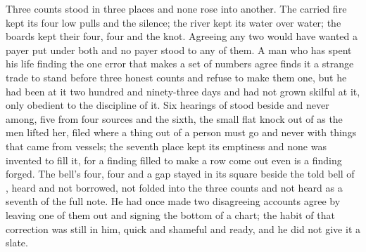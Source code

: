 Three counts stood in three places and none rose into another. The carried fire kept its four low pulls and the silence; the river kept its water over water; the boards kept their four, four and the knot. Agreeing any two would have wanted a payer put under both and no payer stood to any of them. A man who has spent his life finding the one error that makes a set of numbers agree finds it a strange trade to stand before three honest counts and refuse to make them one, but he had been at it two hundred and ninety-three days and had not grown skilful at it, only obedient to the discipline of it. Six hearings of  stood beside and never among, five from four sources and the sixth, the small flat knock out of  as the men lifted her, filed where a thing out of a person must go and never with things that came from vessels; the seventh place kept its emptiness and none was invented to fill it, for a finding filled to make a row come out even is a finding forged. The bell's four, four and a gap stayed in its square beside the told bell of , heard and not borrowed, not folded into the three counts and not heard as a seventh of the full note. He had once made two disagreeing accounts agree by leaving one of them out and signing the bottom of a chart; the habit of that correction was still in him, quick and shameful and ready, and he did not give it a slate.

